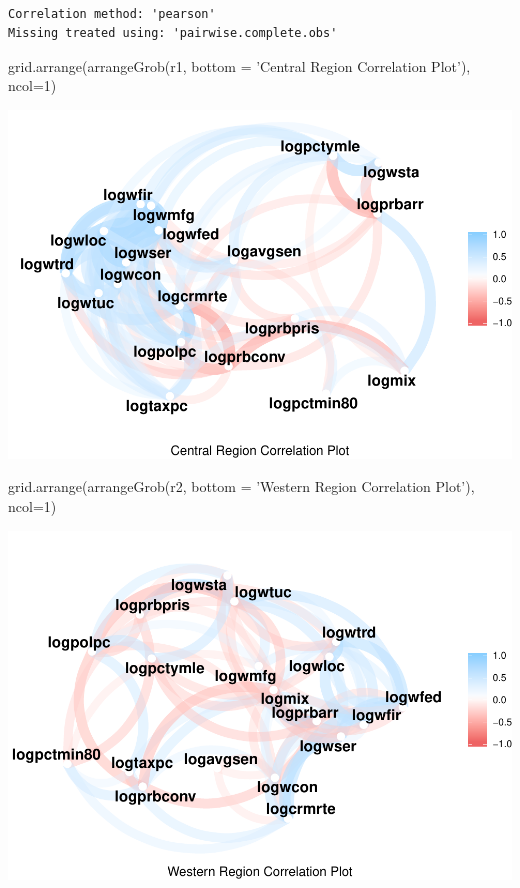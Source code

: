 \documentclass[]{article}
\newenvironment{Shaded}{}{}
\newcommand{\DataTypeTok}[1]{#1}
\newcommand{\DecValTok}[1]{#1}
\newcommand{\KeywordTok}[1]{\textcolor[rgb]{0.00,0.00,1.00}{#1}}
\newcommand{\NormalTok}[1]{#1}
\newcommand{\StringTok}[1]{\textcolor[rgb]{0.00,0.50,0.50}{#1}}
\begin{document}
\begin{verbatim}

Correlation method: 'pearson'
Missing treated using: 'pairwise.complete.obs'
\end{verbatim}

\begin{Shaded}
\begin{Highlighting}[]
\KeywordTok{grid.arrange}\NormalTok{(}\KeywordTok{arrangeGrob}\NormalTok{(r1, }\DataTypeTok{bottom =} \StringTok{'Central Region Correlation Plot'}\NormalTok{), }\DataTypeTok{ncol=}\DecValTok{1}\NormalTok{)}
\end{Highlighting}
\end{Shaded}

\includegraphics{Bagnard_Gaustad_Hartman_Leung_Lab_3_files/figure-latex/unnamed-chunk-103-1.pdf}

\begin{Shaded}
\begin{Highlighting}[]
\KeywordTok{grid.arrange}\NormalTok{(}\KeywordTok{arrangeGrob}\NormalTok{(r2, }\DataTypeTok{bottom =} \StringTok{'Western Region Correlation Plot'}\NormalTok{), }\DataTypeTok{ncol=}\DecValTok{1}\NormalTok{)}
\end{Highlighting}
\end{Shaded}

\includegraphics{Bagnard_Gaustad_Hartman_Leung_Lab_3_files/figure-latex/unnamed-chunk-103-2.pdf}
\end{document}

